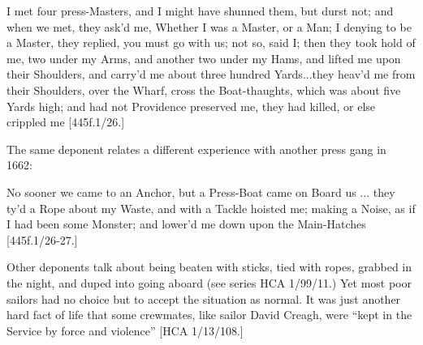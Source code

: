 \begin{styleStandard}
I met four press-Masters, and I might have shunned them, but durst not; and when we met, they ask’d me, Whether I was a Master, or a Man; I denying to be a Master, they replied, you must go with us; not so, said I; then they took hold of me, two under my Arms, and another two under my Hams, and lifted me upon their Shoulders, and carry’d me about three hundred Yards...they heav’d me from their Shoulders, over the Wharf, cross the Boat-thaughts, which was about five Yards high; and had not Providence preserved me, they had killed, or else crippled me [445f.1/26.]
\end{styleStandard}

\begin{styleStandard}
The same deponent relates a different experience with another press gang in 1662:
\end{styleStandard}

\begin{styleStandard}
No sooner we came to an Anchor, but a Press-Boat came on Board us ... they ty’d a Rope about my Waste, and with a Tackle hoisted me; making a Noise, as if I had been some Monster; and lower’d me down upon the Main-Hatches [445f.1/26-27.]
\end{styleStandard}

\begin{styleStandard}
Other deponents talk about being beaten with sticks, tied with ropes, grabbed in the night, and duped into going aboard (see series HCA 1/99/11.) Yet most poor sailors had no choice but to accept the situation as normal. It was just another hard fact of life that some crewmates, like sailor David Creagh, were “kept in the Service by force and violence” [HCA 1/13/108.] 
\end{styleStandard}

